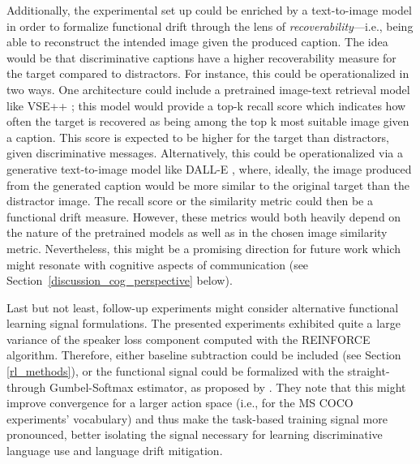 Additionally, the experimental set up could be enriched by a text-to-image model in order to formalize functional drift through the lens of \emph{recoverability}---i.e., being able to reconstruct the intended image given the produced caption. The idea would be that discriminative captions have a higher recoverability measure for the target compared to distractors. For instance, this could be operationalized in two ways. One architecture could include a pretrained image-text retrieval model like VSE++ \parencite{faghri2017vse++}; this model would provide a top-k recall score which indicates how often the target is recovered as being among the top k most suitable image given a caption. This score is expected to be higher for the target than distractors, given discriminative messages. Alternatively, this could be operationalized via a generative text-to-image model like DALL-E \parencite{ramesh2021zero}, where, ideally, the image produced from the generated caption would be more similar to the original target than the distractor image. The recall score or the similarity metric could then be a functional drift measure. However, these metrics would both heavily depend on the nature of the pretrained models as well as in the chosen image similarity metric. Nevertheless, this might be a promising direction for future work which might resonate with cognitive aspects of communication (see Section~\ref{discussion_cog_perspective} below). 

Last but not least, follow-up experiments might consider alternative functional learning signal formulations. The presented experiments exhibited quite a large variance of the speaker loss component computed with the REINFORCE algorithm. Therefore, either baseline subtraction could be included (see Section \ref{rl_methods}), or the functional signal could be formalized with the straight-through Gumbel-Softmax estimator, as proposed by \cite{havrylov2017emergence}. They note that this might improve convergence for a larger action space (i.e., for the MS COCO experiments' vocabulary) and thus make the task-based training signal more pronounced, better isolating the signal necessary for learning discriminative language use and language drift mitigation.

